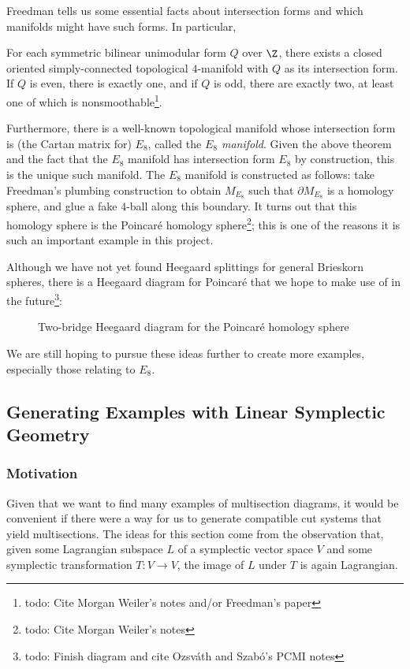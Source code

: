 Freedman tells us some essential facts about intersection forms and which manifolds might have such forms. In particular,
\begin{theorem}
	For each symmetric bilinear unimodular form $Q$ over $\Z$, there exists a closed oriented simply-connected topological $4$-manifold with $Q$ as its intersection form. If $Q$ is even, there is exactly one, and if $Q$ is odd, there are exactly two, at least one of which is nonsmoothable\footnote{todo: Cite Morgan Weiler's notes and/or Freedman's paper}.
\end{theorem}
Furthermore, there is a well-known topological manifold whose intersection form is (the Cartan matrix for) $E_8$, called the \textit{$E_8$ manifold}. Given the above theorem and the fact that the $E_8$ manifold has intersection form $E_8$ by construction, this is the unique such manifold. The $E_8$ manifold is constructed as follows: take Freedman's plumbing construction to obtain $M_{E_8}$ such that $\partial M_{E_8}$ is a homology sphere, and glue a fake $4$-ball along this boundary. It turns out that this homology sphere is the Poincar\'e homology sphere\footnote{todo: Cite Morgan Weiler's notes}; this is one of the reasons it is such an important example in this project.

Although we have not yet found Heegaard splittings for general Brieskorn spheres, there is a Heegaard diagram for Poincar\'e that we hope to make use of in the future\footnote{todo: Finish diagram and cite Ozsv\'ath and Szab\'o's PCMI notes}:
\begin{figure}[H]
    \centering
    \caption{Two-bridge Heegaard diagram for the Poincar\'e homology sphere}
    \label{fig:two-bridge-heegaard-diagram-for-the-poincare-homology-sphere}
\end{figure}

We are still hoping to pursue these ideas further to create more examples, especially those relating to $E_8$.

\subsection{Generating Examples with Linear Symplectic Geometry}

\subsubsection*{Motivation}
Given that we want to find many examples of multisection diagrams, it would be convenient if there were a way for us to generate compatible cut systems that yield multisections. The ideas for this section come from the observation that, given some Lagrangian subspace $L$ of a symplectic vector space $V$ and some symplectic transformation $T: V \to V$, the image of $L$ under $T$ is again Lagrangian.

